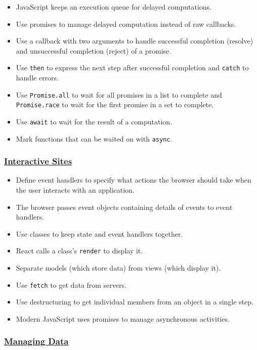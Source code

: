 \begin{itemize}
\tightlist
\item
  JavaScript keeps an execution queue for delayed computations.
\item
  Use promises to manage delayed computation instead of raw callbacks.
\item
  Use a callback with two arguments to handle successful completion
  (resolve) and unsuccessful completion (reject) of a promise.
\item
  Use \texttt{then} to express the next step after successful completion
  and \texttt{catch} to handle errors.
\item
  Use \texttt{Promise.all} to wait for all promises in a list to
  complete and \texttt{Promise.race} to wait for the first promise in a
  set to complete.
\item
  Use \texttt{await} to wait for the result of a computation.
\item
  Mark functions that can be waited on with \texttt{async}.
\end{itemize}

\subsubsection{\texorpdfstring{\protect\hyperlink{s:interactive}{Interactive
Sites}}{Interactive Sites}}\label{null}

\begin{itemize}
\tightlist
\item
  Define event handlers to specify what actions the browser should take
  when the user interacts with an application.
\item
  The browser passes event objects containing details of events to event
  handlers.
\item
  Use classes to keep state and event handlers together.
\item
  React calls a class's \texttt{render} to display it.
\item
  Separate models (which store data) from views (which display it).
\item
  Use \texttt{fetch} to get data from servers.
\item
  Use destructuring to get individual members from an object in a single
  step.
\item
  Modern JavaScript uses promises to manage asynchronous activities.
\end{itemize}

\subsubsection{\texorpdfstring{\protect\hyperlink{s:dataman}{Managing
Data}}{Managing Data}}\label{null}

